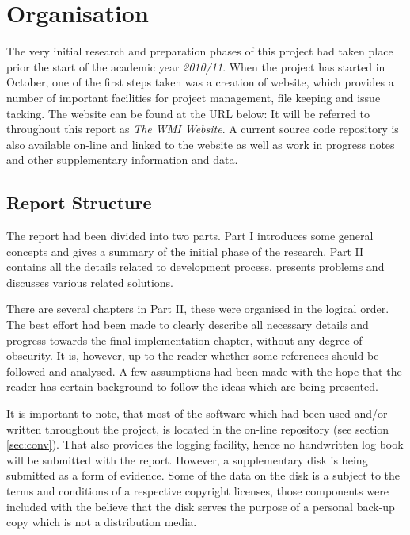 
\section{Organisation}

  The very initial research and preparation phases of this project had taken place
 prior the start of the academic year \emph{2010/11}. When the project has started
 in October, one of the first steps taken was a creation of website, which provides
 a number of important facilities for project management, file keeping and issue
 tacking. The website can be found at the URL below:
 {}
 It will be referred to throughout this report as \emph{The WMI Website}. A current
 source code repository is also available on-line and linked to the website as well
 as work in progress notes and other supplementary information and data.

\subsection{Report Structure}

  The report had been divided into two parts. Part I introduces some
  general concepts and gives a summary of the initial phase of the
  research. Part II contains all the details related to development
  process, presents problems and discusses various related solutions.

  There are several chapters in Part II, these were organised in
  the logical order. The best effort had been made to clearly
  describe all necessary details and progress towards the final
  implementation chapter, without any degree of obscurity. It is,
  however, up to the reader whether some references should be
  followed and analysed. A few assumptions had been made with
  the hope that the reader has certain background to follow
  the ideas which are being presented.

  It is important to note, that most of the software which had
  been used and/or written throughout the project, is located
  in the on-line repository (see section \ref{sec:conv}). That
  also provides the logging facility, hence no handwritten
  log book will be submitted with the report. However, a
  supplementary disk is being submitted as a form of evidence.
  Some of the data on the disk is a subject to the terms and
  conditions of a respective copyright licenses, those components
  were included with the believe that the disk serves the purpose
  of a personal back-up copy which is not a distribution media.


